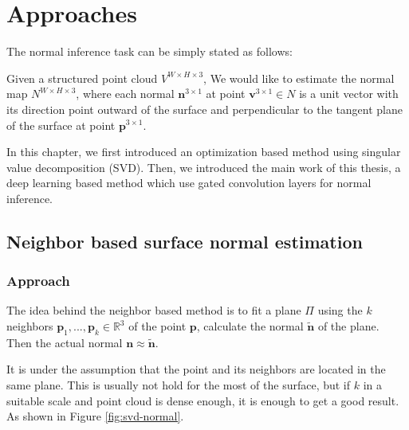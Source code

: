 
\chapter{Approaches} %

\label{ch:03} %


The normal inference task can be simply stated as follows:

Given a structured point cloud $ V^{W\times H\times 3} $,
We would like to estimate the normal map  $ N^{W\times H \times 3} $, where each normal  $ \textbf{n}^{3\times 1} $ at point $ \textbf{v}^{3\times 1} \in N $ is a unit vector with its direction point outward of the surface and perpendicular to the tangent plane of the surface at point $ \textbf{p}^{3\times 1} $.

In this chapter, we first introduced an optimization based method using singular value decomposition (SVD). Then, we introduced the main work of this thesis, a deep learning based method which use gated convolution layers for normal inference. 

\section{Neighbor based surface normal estimation}
\subsection{Approach}

The idea behind the neighbor based method is to fit a plane $ \Pi $ using the $ k $ neighbors $ \textbf{p}_1, ..., \textbf{p}_k \in \mathbb{R}^3 $ of the point $ \textbf{p} $, calculate the normal  $ \tilde{\textbf{n}} $ of the plane. Then the actual normal $ \textbf{n} \approx \tilde{\textbf{n}}  $.

It is under the assumption that the point and its neighbors are located in the same plane. This is usually not hold for the most of the surface, but if $ k $ in a suitable scale and point cloud is dense enough, it is enough to get a good result. As shown in Figure \ref{fig:svd-normal}. 

